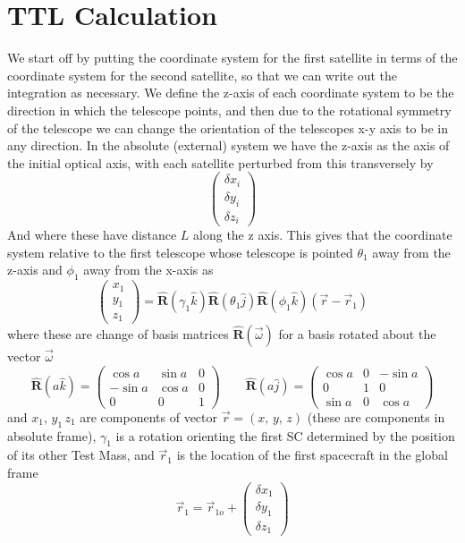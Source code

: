 \documentclass[11pt]{amsart}
\makeatletter
\newcommand{\op}[1]{\mathbf{\hat{#1}}}	%
\newcommand{\0}{\varnothing}		%
\newcommand{\1}{!}
\newcommand{\2}{@}
\newcommand{\3}{\#}
\newcommand{\4}{\$}
\newcommand{\5}{\%}
\newcommand{\6}{$^\wedge$}
\newcommand{\7}{\&}
\newcommand{\8}{*}
\newcommand{\9}{(}
\makeatother
\begin{document}
\section{TTL Calculation}
We start off by putting the coordinate system for the first satellite in terms of the coordinate system for the second satellite, so that we can write out the integration as necessary. We define the z-axis of each coordinate system to be the direction in which the telescope points, and then due to the rotational symmetry of the telescope we can change the orientation of the telescopes x-y axis to be in any direction. In the absolute (external) system we have the z-axis as the axis of the initial optical axis, with each satellite perturbed from this transversely by
\[
\begin{pmatrix} \delta x_i\\\delta y_i\\\delta z_i
\end{pmatrix}
\]
And where these have distance $L$ along the z axis. This gives that the coordinate system relative to the first telescope whose telescope is pointed $\theta_1$ away from the z-axis and $\phi_1$ away from the x-axis as
\[
\begin{pmatrix}x_1\\y_1\\z_1\end{pmatrix} = \op{R}(\gamma_1\hat{k})\op{R}(\theta_1\hat{j})\op{R}(\phi_1\hat{k})\left(\vec{r}-\vec{r}_1\right)
\]
where these are change of basis matrices $\op{R}(\vec{\omega})$ for a basis rotated about the vector $\vec{\omega}$
\[
\op{R}(a\hat{k}) = \begin{pmatrix}\cos a & \sin a & 0\\-\sin a &\cos a &0\\ 0 & 0 & 1\end{pmatrix}\qquad \op{R}(a\hat{j}) = \begin{pmatrix} 
\cos a & 0 & -\sin a\\ 0 & 1 & 0\\ \sin a & 0 & \cos a\end{pmatrix}
\]
and $x_1,\,y_1\,z_1$ are components of vector $\vec{r} = \left(x,\,y,\,z\right)$ (these are components in absolute frame), $\gamma_1$ is a rotation orienting the first SC determined by the position of its other Test Mass, and $\vec{r}_1$ is the location of the first spacecraft in the global frame
\[
\vec{r}_1 = \vec{r}_{1o}+\begin{pmatrix} \delta x_1\\\delta y_1\\\delta z_1
\end{pmatrix}
\]
\end{document}
